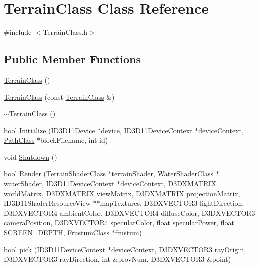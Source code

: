 \hypertarget{class_terrain_class}{}\section{Terrain\+Class Class Reference}
\label{class_terrain_class}


{\ttfamily \#include $<$Terrain\+Class.\+h$>$}

\subsection*{Public Member Functions}
\begin{DoxyCompactItemize}
\item 
\hyperlink{class_terrain_class_aae5b1ce1998dfb5242937d51dfca2809}{Terrain\+Class} ()
\item 
\hyperlink{class_terrain_class_ac1fd7430fe016f3d678dd69b11102245}{Terrain\+Class} (const \hyperlink{class_terrain_class}{Terrain\+Class} \&)
\item 
\hyperlink{class_terrain_class_a6b287f4d422d8f6b9e3206ef1ea2ee27}{$\sim$\+Terrain\+Class} ()
\item 
bool \hyperlink{class_terrain_class_a09e3bc6e0936bd3179cca06ea8338558}{Initialize} (I\+D3\+D11\+Device $\ast$device, I\+D3\+D11\+Device\+Context $\ast$device\+Context, \hyperlink{class_path_class}{Path\+Class} $\ast$block\+Filename, int id)
\item 
void \hyperlink{class_terrain_class_a65329416121922ecd03d3d7b8ebb5f87}{Shutdown} ()
\item 
bool \hyperlink{class_terrain_class_a705e01fe8d579d548ed934ca6059e0c6}{Render} (\hyperlink{class_terrain_shader_class}{Terrain\+Shader\+Class} $\ast$terrain\+Shader, \hyperlink{class_water_shader_class}{Water\+Shader\+Class} $\ast$water\+Shader, I\+D3\+D11\+Device\+Context $\ast$device\+Context, D3\+D\+X\+M\+A\+T\+R\+IX world\+Matrix, D3\+D\+X\+M\+A\+T\+R\+IX view\+Matrix, D3\+D\+X\+M\+A\+T\+R\+IX projection\+Matrix, I\+D3\+D11\+Shader\+Resource\+View $\ast$$\ast$map\+Textures, D3\+D\+X\+V\+E\+C\+T\+O\+R3 light\+Direction, D3\+D\+X\+V\+E\+C\+T\+O\+R4 ambient\+Color, D3\+D\+X\+V\+E\+C\+T\+O\+R4 diffuse\+Color, D3\+D\+X\+V\+E\+C\+T\+O\+R3 camera\+Position, D3\+D\+X\+V\+E\+C\+T\+O\+R4 specular\+Color, float specular\+Power, float \hyperlink{_graphics_class_8h_ae4d41ac39678c64d2ef730cecc77cc64}{S\+C\+R\+E\+E\+N\+\_\+\+D\+E\+P\+TH}, \hyperlink{class_frustum_class}{Frustum\+Class} $\ast$frustum)
\item 
bool \hyperlink{class_terrain_class_a59561b131a44578d5e9658cc3b9f94b1}{pick} (I\+D3\+D11\+Device\+Context $\ast$device\+Context, D3\+D\+X\+V\+E\+C\+T\+O\+R3 ray\+Origin, D3\+D\+X\+V\+E\+C\+T\+O\+R3 ray\+Direction, int \&prov\+Num, D3\+D\+X\+V\+E\+C\+T\+O\+R3 \&point)
$$
\end{DoxyCompactItemize}
